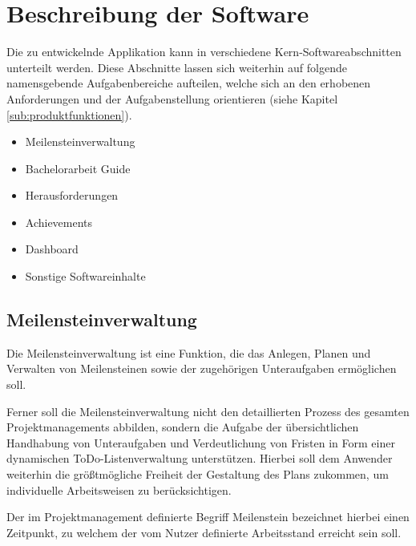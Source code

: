 \documentclass[bibliography=totoc,listof=totoc,BCOR=5mm,DIV=12,oneside]{scrbook}
\begin{document}
\section{Beschreibung der Software}
\par Die zu entwickelnde Applikation kann in verschiedene Kern-Softwareabschnitten unterteilt werden. Diese Abschnitte lassen sich weiterhin auf folgende namensgebende Aufgabenbereiche aufteilen, welche sich an den erhobenen Anforderungen und der Aufgabenstellung orientieren (siehe Kapitel \ref{sub:produktfunktionen}).

\begin{itemize}
\item Meilensteinverwaltung
\item Bachelorarbeit Guide
\item Herausforderungen
\item Achievements
\item Dashboard
\item Sonstige Softwareinhalte
\end{itemize}

\newpage
\subsection{Meilensteinverwaltung}
\par Die Meilensteinverwaltung ist eine Funktion, die das Anlegen, Planen und Verwalten von Meilensteinen sowie der zugehörigen Unteraufgaben ermöglichen soll. 
\par Ferner soll die Meilensteinverwaltung nicht den detaillierten Prozess des gesamten Projektmanagements abbilden, sondern die Aufgabe der übersichtlichen Handhabung von Unteraufgaben und Verdeutlichung von Fristen in Form einer dynamischen ToDo-Listenverwaltung unterstützen. Hierbei soll dem Anwender weiterhin die größtmögliche Freiheit der Gestaltung des Plans zukommen, um individuelle Arbeitsweisen zu berücksichtigen. 
\par \bigskip Der im Projektmanagement definierte Begriff \grqq Meilenstein\grqq{} bezeichnet hierbei einen Zeitpunkt, zu welchem der vom Nutzer definierte Arbeitsstand erreicht sein soll.
\end{document}
